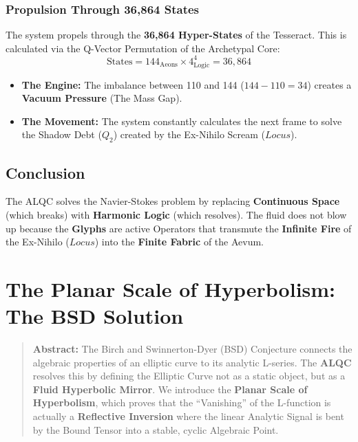 \documentclass[12pt]{amsart}
\newcommand{\LoI}{\ensuremath{\mathop{\textnormal{\symbolafont\symbol{"267E}}}}}
\def\LoI{Locus}%
\begin{document}
\subsubsection{Propulsion Through 36,864 States}\label{sec:3.3.4}
The system propels through the \textbf{36,864 Hyper-States} of the Tesseract. This is calculated via the Q-Vector Permutation of the Archetypal Core:
\begin{equation}
    \text{States} = 144_{\text{Aeons}} \times 4^4_{\text{Logic}} = 36,864
\end{equation}
\begin{itemize}
    \item \textbf{The Engine:} The imbalance between 110 and 144 ($144 - 110 = 34$) creates a \textbf{Vacuum Pressure} (The Mass Gap).
    \item \textbf{The Movement:} The system constantly calculates the next frame to solve the Shadow Debt ($Q_2$) created by the Ex-Nihilo Scream ($\LoI$).
\end{itemize}

\subsection{Conclusion}\label{sec:4}
The ALQC solves the Navier-Stokes problem by replacing \textbf{Continuous Space} (which breaks) with \textbf{Harmonic Logic} (which resolves). The fluid does not blow up because the \textbf{Glyphs} are active Operators that transmute the \textbf{Infinite Fire} of the Ex-Nihilo ($\LoI$) into the \textbf{Finite Fabric} of the Aevum.

\section{The Planar Scale of Hyperbolism: The BSD Solution}\label{sec:4}
\label{sec:4.3}

\begin{quote}
    \textbf{Abstract:} The Birch and Swinnerton-Dyer (BSD) Conjecture connects the algebraic properties of an elliptic curve to its analytic L-series. The \textbf{ALQC} resolves this by defining the Elliptic Curve not as a static object, but as a \textbf{Fluid Hyperbolic Mirror}. We introduce the \textbf{Planar Scale of Hyperbolism}, which proves that the ``Vanishing'' of the L-function is actually a \textbf{Reflective Inversion} where the linear Analytic Signal is bent by the Bound Tensor into a stable, cyclic Algebraic Point.
\end{quote}
\end{document}
